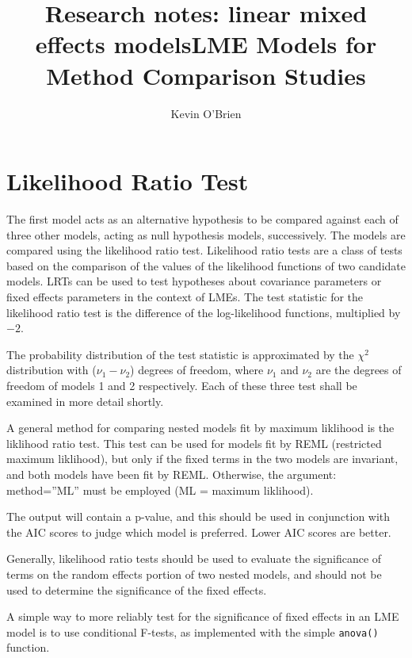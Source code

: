 \documentclass[12pt, a4paper]{report}
\title{Research notes: linear mixed effects models}
\author{ } \date{ }
\theoremstyle{plain}
\theoremstyle{definition}
\theoremstyle{remark}
\begin{document}
\author{Kevin O'Brien}
\title{LME Models for Method Comparison Studies}



\section{Likelihood Ratio Test}
The first model acts as an alternative hypothesis to be compared against each of three other models, acting as null hypothesis models, successively. The models are compared using the likelihood ratio test. Likelihood ratio tests are a class of tests based on the comparison of the values of the likelihood functions of two candidate models. LRTs can be used to test hypotheses about covariance parameters or fixed effects parameters in the context of LMEs. The test statistic for the likelihood ratio test is the difference of the log-likelihood functions, multiplied by $-2$.

The probability distribution of the test statistic is approximated by the $\chi^2$ distribution with ($\nu_{1} - \nu_{2}$) degrees of freedom, where $\nu_{1}$ and $\nu_{2}$ are the degrees of freedom of models 1 and 2 respectively. Each of these three test shall be examined in more detail shortly.



A general method for comparing nested models fit by maximum liklihood is the liklihood ratio 
test. This test can be used for models fit by REML (restricted maximum liklihood), but only if the 
fixed terms in the two models are invariant, and both models have been fit by REML. Otherwise, 
the argument: method=”ML” must be employed (ML = maximum liklihood). 




The output will contain a p-value, and this should be used in conjunction with the AIC scores to 
judge which model is preferred. Lower AIC scores are better. 

Generally, likelihood ratio tests should be used to evaluate the significance of terms on the 
random effects portion of two nested models, and should not be used to determine the 
significance of the fixed effects. 

A simple way to more reliably test for the significance of fixed effects in an LME model is to use 
conditional F-tests, as implemented with the simple \texttt{anova()} function. 




\newpage
\end{document}
